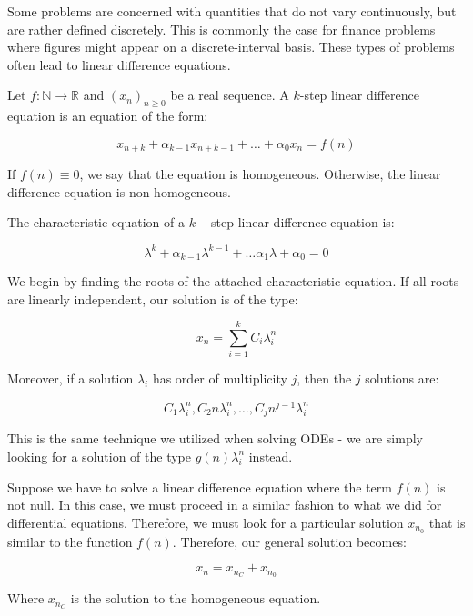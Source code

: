 \documentclass[12pt]{article}
\begin{document}
Some problems are concerned with quantities that do not vary continuously, but are rather defined discretely. This is commonly the case for finance problems where figures might appear on a discrete-interval basis. These types of problems often lead to linear difference equations.

\begin{definition}
    Let $f : \mathbb{N} \to \mathbb{R}$ and $(x_n)_{n \geq 0}$ be a real sequence. A $k$-step linear difference equation is an equation of the form:

    \[ x_{n + k} + \alpha_{k-1}x_{n + k - 1} + \dots + \alpha_0x_{n} = f(n) \]
\end{definition}

If $f(n) \equiv 0$, we say that the equation is homogeneous. Otherwise, the linear difference equation is non-homogeneous.

\begin{definition}
    The characteristic equation of a $k-$step linear difference equation is:

    \[ \lambda^k + \alpha_{k-1}\lambda^{k-1} + \dots \alpha_1\lambda + \alpha_0 = 0 \]
\end{definition}

\begin{proposition}
    We begin by finding the roots of the attached characteristic equation. If all roots are linearly independent, our solution is of the type:

    \[ x_n = \sum_{i = 1}^k C_i\lambda_i^n \]

    Moreover, if a solution $\lambda_i$ has order of multiplicity $j$, then the $j$ solutions are:

    \[ C_1\lambda_i^n, C_2n\lambda_i^n, \dots, C_jn^{j - 1}\lambda_i^n \]

    This is the same technique we utilized when solving ODEs - we are simply looking for a solution of the type $g(n)\lambda_i^n$ instead.
\end{proposition}

\begin{proposition}
    Suppose we have to solve a linear difference equation where the term $f(n)$ is not null. In this case, we must proceed in a similar fashion to what we did for differential equations. Therefore, we must look for a particular solution $x_{n_0}$ that is similar to the function $f(n)$. Therefore, our general solution becomes:

    \[ x_n = x_{n_C} + x_{n_0} \]

    Where $x_{n_C}$ is the solution to the homogeneous equation.
\end{proposition}
\end{document}
